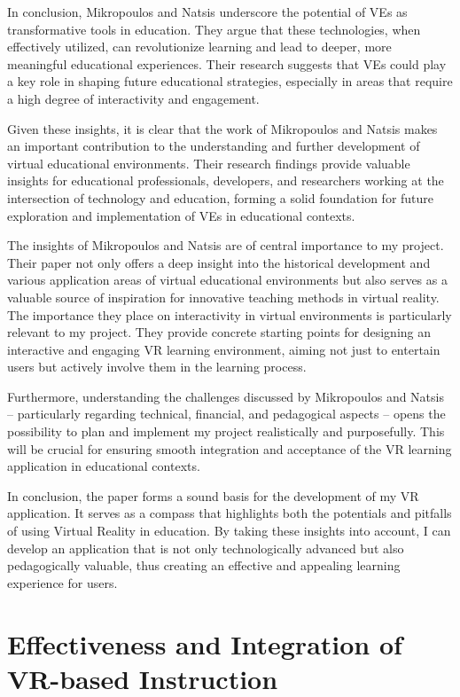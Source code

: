 \documentclass[draft, final]{vutinfth} %
\begin{document}
In conclusion, Mikropoulos and Natsis underscore the potential of VEs as transformative tools in education. They argue that these technologies, when effectively utilized, can revolutionize learning and lead to deeper, more meaningful educational experiences. Their research suggests that VEs could play a key role in shaping future educational strategies, especially in areas that require a high degree of interactivity and engagement.

Given these insights, it is clear that the work of Mikropoulos and Natsis makes an important contribution to the understanding and further development of virtual educational environments. Their research findings provide valuable insights for educational professionals, developers, and researchers working at the intersection of technology and education, forming a solid foundation for future exploration and implementation of VEs in educational contexts.

The insights of Mikropoulos and Natsis are of central importance to my project. Their paper not only offers a deep insight into the historical development and various application areas of virtual educational environments but also serves as a valuable source of inspiration for innovative teaching methods in virtual reality. The importance they place on interactivity in virtual environments is particularly relevant to my project. They provide concrete starting points for designing an interactive and engaging VR learning environment, aiming not just to entertain users but actively involve them in the learning process.

Furthermore, understanding the challenges discussed by Mikropoulos and Natsis -- particularly regarding technical, financial, and pedagogical aspects -- opens the possibility to plan and implement my project realistically and purposefully. This will be crucial for ensuring smooth integration and acceptance of the VR learning application in educational contexts.

In conclusion, the paper forms a sound basis for the development of my VR application. It serves as a compass that highlights both the potentials and pitfalls of using Virtual Reality in education. By taking these insights into account, I can develop an application that is not only technologically advanced but also pedagogically valuable, thus creating an effective and appealing learning experience for users.

\section{Effectiveness and Integration of VR-based Instruction}
\end{document}
